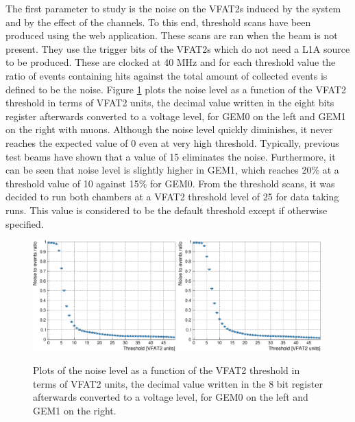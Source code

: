       The first parameter to study is the noise on the VFAT2s induced by the system and by the effect of the channels. To this end, threshold scans have been produced using the web application. These scans are ran when the beam is not present. They use the trigger bits of the VFAT2s which do not need a L1A source to be produced. These are clocked at 40 MHz and for each threshold value the ratio of events containing hits against the total amount of collected events is defined to be the noise. Figure \ref{fig:II-3-data-threshold} plots the noise level as a function of the VFAT2 threshold in terms of VFAT2 units, the decimal value written in the eight bits register afterwards converted to a voltage level, for GEM0 on the left and GEM1 on the right with muons. Although the noise level quickly diminishes, it never reaches the expected value of 0 even at very high threshold. Typically, previous test beams have shown that a value of 15 eliminates the noise. Furthermore, it can be seen that noise level is slightly higher in GEM1, which reaches 20\% at a threshold value of 10 against 15\% for GEM0. From the threshold scans, it was decided to run both chambers at a VFAT2 threshold level of 25 for data taking runs. This value is considered to be the default threshold except if otherwise specified. \\

      \begin{figure}[h!]
        \centering
        \includegraphics[width=0.49\textwidth]{img/plots/cThresholdScan_GEM0-crop}
        \includegraphics[width=0.49\textwidth]{img/plots/cThresholdScan_GEM1-crop}
        \caption{Plots of the noise level as a function of the VFAT2 threshold in terms of VFAT2 units, the decimal value written in the 8 bit register afterwards converted to a voltage level, for GEM0 on the left and GEM1 on the right.}
        \label{fig:II-3-data-threshold}
      \end{figure}

